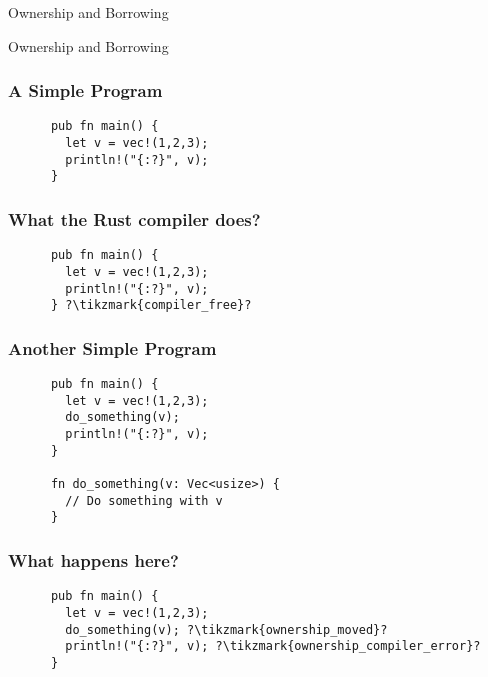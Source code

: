 \begin{section}{Ownership and Borrowing}

  \begin{frame}
    \centerline{
      \huge{Ownership and Borrowing}
    }
  \end{frame}

  \begin{frame}[fragile]
    \frametitle{A Simple Program}
    \begin{verbatim}
      pub fn main() {
        let v = vec!(1,2,3);
        println!("{:?}", v);
      }
    \end{verbatim}
  \end{frame}

  \begin{frame}[fragile]
    \frametitle{What the Rust compiler does?}
    \begin{verbatim}
      pub fn main() {
        let v = vec!(1,2,3);
        println!("{:?}", v);
      } ?\tikzmark{compiler_free}?
    \end{verbatim}
  \end{frame}

  \begin{frame}[fragile]
    \frametitle{Another Simple Program}
    \begin{verbatim}
      pub fn main() {
        let v = vec!(1,2,3);
        do_something(v);
        println!("{:?}", v);
      }

      fn do_something(v: Vec<usize>) {
        // Do something with v
      }
    \end{verbatim}
  \end{frame}

  \begin{frame}[fragile]
    \frametitle{What happens here?}
    \begin{verbatim}
      pub fn main() {
        let v = vec!(1,2,3);
        do_something(v); ?\tikzmark{ownership_moved}?
        println!("{:?}", v); ?\tikzmark{ownership_compiler_error}?
      }


\end{verbatim}
\end{frame}
\end{section}
